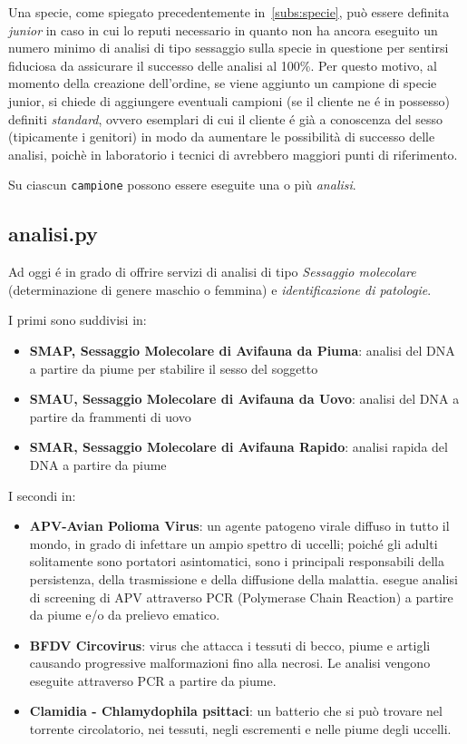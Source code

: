 Una specie, come spiegato precedentemente in~\ref{subs:specie}, può essere definita \emph{junior} in caso in cui {\fem} lo reputi necessario in quanto non ha ancora eseguito un numero minimo di analisi di tipo sessaggio sulla specie in questione per sentirsi fiduciosa da assicurare il successo delle analisi al 100\%. Per questo motivo, al momento della creazione dell'ordine, se viene aggiunto un campione di specie junior, si chiede di aggiungere eventuali campioni (se il cliente ne é in possesso) definiti \emph{standard}, ovvero esemplari di cui il cliente é già a conoscenza del sesso (tipicamente i genitori) in modo da aumentare le possibilità di successo delle analisi, poichè in laboratorio i tecnici di {\fem} avrebbero maggiori punti di riferimento.

Su ciascun \texttt{campione} possono essere eseguite una o più \emph{analisi}.

\subsection*{analisi.py}
\label{subs:analisi}
Ad oggi {\fem} é in grado di offrire servizi di analisi di tipo \emph{Sessaggio molecolare} (determinazione di genere maschio o femmina) e \emph{identificazione di patologie}.

I primi sono suddivisi in:
\begin{itemize}
 \item \textbf{SMAP, Sessaggio Molecolare di Avifauna da Piuma}: analisi del DNA a partire da piume per stabilire il sesso del soggetto    
 \item \textbf{SMAU, Sessaggio Molecolare di Avifauna da Uovo}: analisi del DNA a partire da frammenti di uovo 
 \item \textbf{SMAR, Sessaggio Molecolare di Avifauna Rapido}: analisi rapida del DNA a partire da piume
\end{itemize}

I secondi in:
\begin{itemize}
 \item \textbf{APV-Avian Polioma Virus}: un agente patogeno virale diffuso in tutto il mondo, in grado di infettare un ampio spettro di uccelli; poiché gli adulti solitamente sono portatori asintomatici, sono i principali responsabili della persistenza, della trasmissione e della diffusione della malattia. {\fem} esegue analisi di screening di APV attraverso PCR (Polymerase Chain Reaction) a partire da piume e/o da prelievo ematico.
 \item \textbf{BFDV Circovirus}: virus che attacca i tessuti di becco, piume e artigli causando progressive malformazioni fino alla necrosi. Le analisi vengono eseguite attraverso PCR a partire da piume.
 \item \textbf{Clamidia - Chlamydophila psittaci}: un batterio che si può trovare nel torrente circolatorio, nei tessuti, negli escrementi e nelle piume degli uccelli.
\end{itemize}

